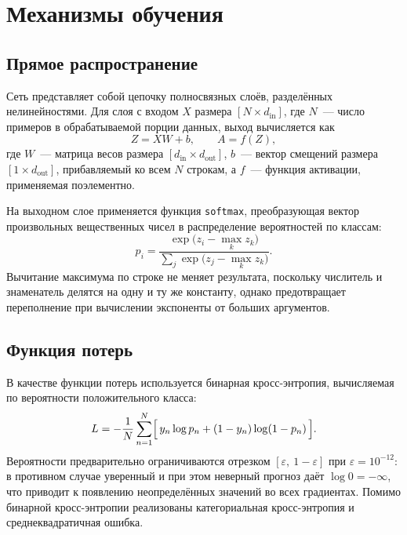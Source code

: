 \chapter{Механизмы обучения}\label{ch:theory}

\section{Прямое распространение}

Сеть представляет собой цепочку полносвязных слоёв, разделённых нелинейностями. Для слоя
с входом $X$ размера $[N \times d_{\text{in}}]$, где $N$~--- число примеров в обрабатываемой
порции данных, выход вычисляется как
\begin{equation}
    Z = X W + b, \qquad A = f(Z),
\end{equation}
где $W$~--- матрица весов размера $[d_{\text{in}} \times d_{\text{out}}]$, $b$~--- вектор
смещений размера $[1 \times d_{\text{out}}]$, прибавляемый ко всем $N$ строкам, а $f$~---
функция активации, применяемая поэлементно.

На выходном слое применяется функция \texttt{softmax}, преобразующая вектор произвольных
вещественных чисел в распределение вероятностей по классам:
\begin{equation}
    p_i = \frac{\exp\bigl(z_i - \max_k z_k\bigr)}{\sum_j \exp\bigl(z_j - \max_k z_k\bigr)}.
    \label{eq:softmax}
\end{equation}
Вычитание максимума по строке не меняет результата, поскольку числитель и знаменатель
делятся на одну и ту же константу, однако предотвращает переполнение при вычислении
экспоненты от больших аргументов.

\section{Функция потерь}

В качестве функции потерь используется бинарная кросс-энтропия, вычисляемая по
вероятности положительного класса:
\begin{equation}
    L = -\frac{1}{N}\sum_{n=1}^{N}
        \Bigl[\, y_n \log p_n + (1 - y_n)\log(1 - p_n) \,\Bigr].
    \label{eq:bce}
\end{equation}
Вероятности предварительно ограничиваются отрезком $[\varepsilon,\ 1-\varepsilon]$ при
$\varepsilon = 10^{-12}$: в противном случае уверенный и при этом неверный прогноз даёт
$\log 0 = -\infty$, что приводит к появлению неопределённых значений во всех градиентах.
Помимо бинарной кросс-энтропии реализованы категориальная кросс-энтропия и
среднеквадратичная ошибка.

